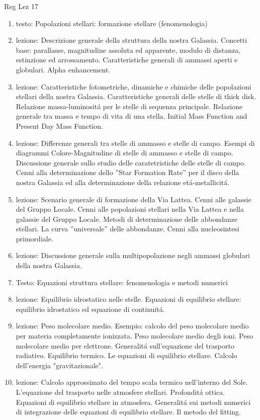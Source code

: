 \begin{frame}[allowframebreaks]{Reg Lez 17}
\begin{enumerate}
\item testo: Popolazioni stellari: formazione stellare (fenomenologia)
\item lezione: Descrizione generale della struttura della nostra Galassia. Concetti base: parallasse, magnitudine assoluta ed apparente, modulo di distanza, estinzione ed arrossamento. Caratteristiche generali di ammassi aperti e globulari. Alpha enhancement.
\item lezione: Caratteristiche fotometriche, dinamiche e chimiche delle popolazioni stellari della nostra Galassia. Caratteristiche generali delle stelle di thick disk. Relazione massa-luminosit\'a per le stelle di sequenza principale. Relazione generale tra massa e tempo di vita di una stella. Initial Mass Function and Present Day Mass Function.
\item lezione: Differenze generali tra stelle di ammasso e stelle di campo. Esempi di diagrammi Colore-Magnitudine di stelle di ammasso e stelle di campo. Discussione generale sullo studio delle caratetristiche delle stelle di campo. Cenni alla determinazione dello ''Star Formation Rate'' per il disco della nostra Galassia ed alla determinazione della relazione et\'a-metallicit\'a. 
\item lezione: Scenario generale di formazione della Via Lattea. Cenni alle galassie del Gruppo Locale. Cenni alle popolazioni stellari nella Via Lattea e nella galassie del Gruppo Locale. Metodi di determinazione delle abbondanze stellari. La curva ''universale'' delle abbondanze. Cenni alla nucleosintesi primordiale.
\item lezione: Discussione generale sulla multipopolazione negli ammassi globulari della nostra Galassia. 
\item Testo: Equazioni struttura stellare: fenomenologia e metodi numerici
\item lezione: Equilibrio idrostatico nelle stelle. Equazioni di equilibrio stellare: equilibrio idrostatico ed equazione di continuit\'a.
\item lezione: Peso molecolare medio. Esempio: calcolo del peso molecolare medio per materia completamente ionizzata. Peso molecolare medio degli ioni. Peso molecolare medio per elettrone. Generalit\'a sull'equazione del trasporto radiativo. Equilibrio termico. Le equazioni di equilibrio stellare. Calcolo dell'energia "gravitazionale".
\item lezione: Calcolo approssimato del tempo scala termico nell'interno del Sole. L'equazione del trasporto nelle atmosfere stellari. Profondit\'a ottica. Equazioni di equilibrio stellare in atmosfera. Generalit\'a sui metodi numerici di integrazione delle equazioni di equilibrio stellare. Il metodo del fitting.

\end{enumerate}
\end{frame}

